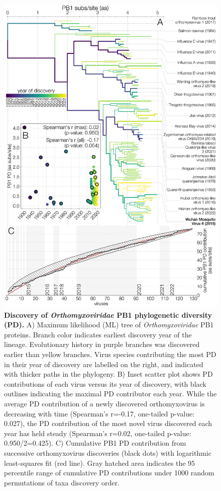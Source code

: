 \documentclass[11pt,twocolumn]{article}
\begin{document}
\begin{figure}%
\centering
\includegraphics[width=0.8\linewidth]{Fig3_contributions.png}
\caption{
\textbf{Discovery of \textit{Orthomyxoviridae} PB1 phylogenetic diversity (PD).}
A) Maximum likelihood (ML) tree of \textit{Orthomyxoviridae} PB1 proteins.
Branch color indicates earliest discovery year of the lineage. Evolutionary history in purple branches was discovered earlier than yellow branches. Virus species contributing the most PD in their year of discovery are labelled on the right, and indicated with thicker paths in the phylogeny.
B) Inset scatter plot shows PD contributions of each virus versus its year of discovery, with black outlines indicating the maximal PD contributor each year.
While the average PD contribution of a newly discovered orthomyxovirus is decreasing with time (Spearman's r=-0.17, one-tailed p-value: 0.027), the PD contribution of the most novel virus discovered each year has held steady (Spearman's r=0.02, one-tailed p-value: 0.950/2=0.425).
C) Cumulative PB1 PD contribution from successive orthomyxovirus discoveries (black dots) with logarithmic least-squares fit (red line).
Gray hatched area indicates the 95 percentile range of cumulative PD contributions under 1000 random permutations of taxa discovery order.
}
\label{fig:contributions}
\end{figure}
\end{document}
